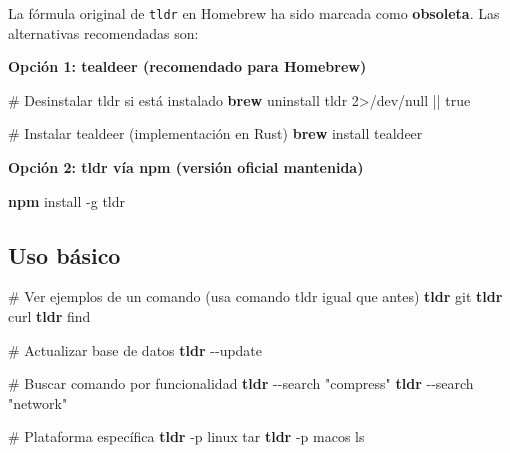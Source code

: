 \documentclass[
  11pt,
  letterpaper,
  oneside,
  openany]{scrbook}
\newenvironment{Shaded}{}{}
\newcommand{\AttributeTok}[1]{\textcolor[rgb]{0.84,0.23,0.29}{#1}}
\newcommand{\CommentTok}[1]{\textcolor[rgb]{0.42,0.45,0.49}{#1}}
\newcommand{\DecValTok}[1]{\textcolor[rgb]{0.00,0.36,0.77}{#1}}
\newcommand{\ExtensionTok}[1]{\textcolor[rgb]{0.84,0.23,0.29}{\textbf{#1}}}
\newcommand{\FunctionTok}[1]{\textcolor[rgb]{0.44,0.26,0.76}{#1}}
\newcommand{\KeywordTok}[1]{\textcolor[rgb]{0.84,0.23,0.29}{#1}}
\newcommand{\NormalTok}[1]{\textcolor[rgb]{0.14,0.16,0.18}{#1}}
\newcommand{\OperatorTok}[1]{\textcolor[rgb]{0.14,0.16,0.18}{#1}}
\newcommand{\StringTok}[1]{\textcolor[rgb]{0.01,0.18,0.38}{#1}}
\begin{document}
\begin{tcolorbox}[enhanced jigsaw, toprule=.15mm, bottomrule=.15mm, opacityback=0, coltitle=black, rightrule=.15mm, colframe=quarto-callout-warning-color-frame, titlerule=0mm, opacitybacktitle=0.6, left=2mm, colback=white, bottomtitle=1mm, arc=.35mm, leftrule=.75mm, title=\textcolor{quarto-callout-warning-color}{\faExclamationTriangle}\hspace{0.5em}{⚠️ Migración desde tldr}, colbacktitle=quarto-callout-warning-color!10!white, breakable, toptitle=1mm]

La fórmula original de \texttt{tldr} en Homebrew ha sido marcada como
\textbf{obsoleta}. Las alternativas recomendadas son:

\textbf{Opción 1: tealdeer (recomendado para Homebrew)}

\begin{Shaded}
\begin{Highlighting}[]
\CommentTok{\# Desinstalar tldr si está instalado}
\ExtensionTok{brew}\NormalTok{ uninstall tldr }\DecValTok{2}\OperatorTok{\textgreater{}}\NormalTok{/dev/null }\KeywordTok{||} \FunctionTok{true}

\CommentTok{\# Instalar tealdeer (implementación en Rust)}
\ExtensionTok{brew}\NormalTok{ install tealdeer}
\end{Highlighting}
\end{Shaded}

\textbf{Opción 2: tldr vía npm (versión oficial mantenida)}

\begin{Shaded}
\begin{Highlighting}[]
\ExtensionTok{npm}\NormalTok{ install }\AttributeTok{{-}g}\NormalTok{ tldr}
\end{Highlighting}
\end{Shaded}

\end{tcolorbox}

\subsection{Uso básico}\label{uso-buxe1sico-7}

\begin{Shaded}
\begin{Highlighting}[]
\CommentTok{\# Ver ejemplos de un comando (usa comando \textquotesingle{}tldr\textquotesingle{} igual que antes)}
\ExtensionTok{tldr}\NormalTok{ git}
\ExtensionTok{tldr}\NormalTok{ curl}
\ExtensionTok{tldr}\NormalTok{ find}

\CommentTok{\# Actualizar base de datos}
\ExtensionTok{tldr} \AttributeTok{{-}{-}update}

\CommentTok{\# Buscar comando por funcionalidad}
\ExtensionTok{tldr} \AttributeTok{{-}{-}search} \StringTok{"compress"}
\ExtensionTok{tldr} \AttributeTok{{-}{-}search} \StringTok{"network"}

\CommentTok{\# Plataforma específica}
\ExtensionTok{tldr} \AttributeTok{{-}p}\NormalTok{ linux tar}
\ExtensionTok{tldr} \AttributeTok{{-}p}\NormalTok{ macos ls}
\end{Highlighting}
\end{Shaded}
\end{document}
